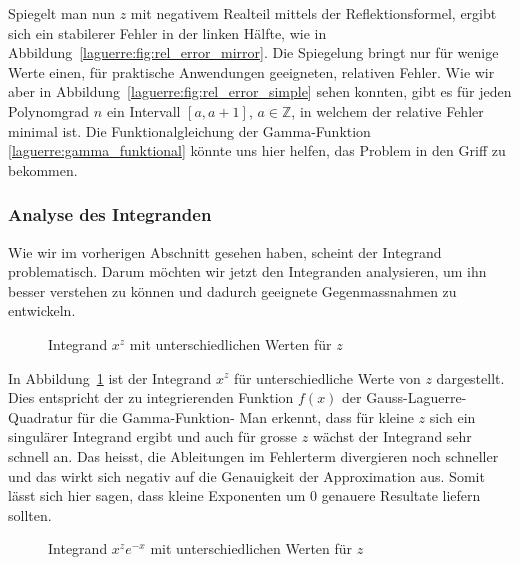 Spiegelt man nun $z$ mit negativem Realteil mittels der Reflektionsformel,
ergibt sich ein stabilerer Fehler in der linken Hälfte,
wie in Abbildung~\ref{laguerre:fig:rel_error_mirror}.
Die Spiegelung bringt nur für wenige Werte einen,
für praktische Anwendungen geeigneten,
relativen Fehler.
Wie wir aber in Abbildung~\ref{laguerre:fig:rel_error_simple} sehen konnten,
gibt es für jeden Polynomgrad $n$ ein Intervall $[a, a+1]$, $a \in \mathbb{Z}$,
in welchem der relative Fehler minimal ist.
Die Funktionalgleichung der Gamma-Funktion \eqref{laguerre:gamma_funktional}
könnte uns hier helfen,
das Problem in den Griff zu bekommen.

\subsubsection{Analyse des Integranden}
Wie wir im vorherigen Abschnitt gesehen haben,
scheint der Integrand problematisch.
Darum möchten wir jetzt den Integranden analysieren,
um ihn besser verstehen zu können
und dadurch geeignete Gegenmassnahmen zu entwickeln.


\begin{figure}
\centering

\caption{Integrand $x^z$ mit unterschiedlichen Werten für $z$}
\label{laguerre:fig:integrand}
\end{figure}

In Abbildung~\ref{laguerre:fig:integrand} ist der Integrand $x^z$ für
unterschiedliche Werte von $z$ dargestellt.
Dies entspricht der zu integrierenden Funktion $f(x)$
der Gauss-Laguerre-Quadratur für die Gamma-Funktion-
Man erkennt,
dass für kleine $z$ sich ein singulärer Integrand ergibt
und auch für grosse $z$ wächst der Integrand sehr schnell an.
Das heisst,
die Ableitungen im Fehlerterm divergieren noch schneller
und das wirkt sich negativ auf die Genauigkeit der Approximation aus.
Somit lässt sich hier sagen,
dass kleine Exponenten um $0$ genauere Resultate liefern sollten.

\begin{figure}
\centering

\caption{Integrand $x^z e^{-x}$ mit unterschiedlichen Werten für $z$}
\label{laguerre:fig:integrand_exp}
\end{figure}

